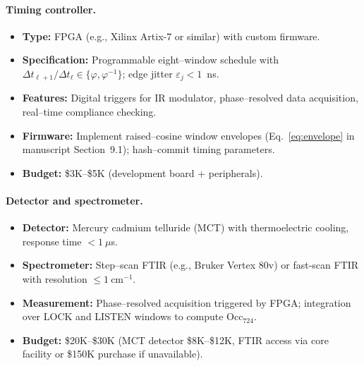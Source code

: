 \documentclass[11pt]{article}
\begin{document}
\paragraph{Timing controller.}
\begin{itemize}
\item \textbf{Type:} FPGA (e.g., Xilinx Artix-7 or similar) with custom firmware.
\item \textbf{Specification:} Programmable eight–window schedule with $\Delta t_{\ell+1}/\Delta t_\ell\in\{\varphi,\varphi^{-1}\}$; edge jitter $\varepsilon_j<1$~ns.
\item \textbf{Features:} Digital triggers for IR modulator, phase–resolved data acquisition, real–time compliance checking.
\item \textbf{Firmware:} Implement raised–cosine window envelopes (Eq.~\eqref{eq:envelope} in manuscript Section~9.1); hash–commit timing parameters.
\item \textbf{Budget:} \$3K–\$5K (development board + peripherals).
\end{itemize}

\paragraph{Detector and spectrometer.}
\begin{itemize}
\item \textbf{Detector:} Mercury cadmium telluride (MCT) with thermoelectric cooling, response time $<1~\mu$s.
\item \textbf{Spectrometer:} Step–scan FTIR (e.g., Bruker Vertex 80v) or fast-scan FTIR with resolution $\le 1~\mathrm{cm^{-1}}$.
\item \textbf{Measurement:} Phase–resolved acquisition triggered by FPGA; integration over \textsf{LOCK} and \textsf{LISTEN} windows to compute $\mathrm{Occ}_{724}$.
\item \textbf{Budget:} \$20K–\$30K (MCT detector \$8K–\$12K, FTIR access via core facility or \$150K purchase if unavailable).
\end{itemize}
\end{document}
